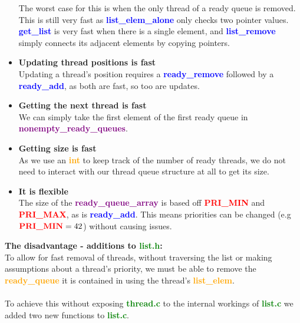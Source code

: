 \documentclass{report}
\newcommand{\bullpara}[2]{\item \textbf{#1} \ #2}
\newcommand{\fun}[1]{\textcolor{blue}{\textbf{#1}}}
\newcommand{\file}[1]{\textcolor{green}{\textbf{#1}}}
\newcommand{\struct}[1]{\textcolor{orange}{\textbf{#1}}}
\newcommand{\var}[1]{\textcolor{purple}{\textbf{#1}}}
\newcommand{\const}[1]{\textcolor{red}{\textbf{#1}}}
\newcommand{\pintoscode}[4]{}
\begin{document}
\begin{itemize}
{\begin{enumerate}
                        \end{enumerate}
                        The worst case for this is when the only thread of a ready queue is removed. This is still very fast as \fun{list\_elem\_alone} only checks two pointer values. \fun{get\_list} is very fast when there is a single element, and \fun{list\_remove} simply connects its adjacent elements by copying pointers.
                    }
                    \bullpara{Updating thread positions is fast}{
                        \\ Updating a thread's position requires a \fun{ready\_remove} followed by a \fun{ready\_add}, as both are fast, so too are updates.
                    }
                    \bullpara{Getting the next thread is fast}{
                        \\ We can simply take the first element of the first ready queue in \var{nonempty\_ready\_queues}.
                    }
                    \bullpara{Getting size is fast}{
                        \\ As we use an \struct{int} to keep track of the number of ready threads, we do not need to interact with our thread queue structure at all to get its size.
                    }
                    \bullpara{It is flexible}{
                        \\ The size of the \var{ready\_queue\_array} is based off \const{PRI\_MIN} and \const{PRI\_MAX}, as is \fun{ready\_add}. This means priorities can be changed (e.g $\text{\const{PRI\_MIN}} = 42$) without causing issues.
                    }
                \end{itemize}
                \textbf{The disadvantage - additions to \file{list.h}:}
                \\ To allow for fast removal of threads, without traversing the list or making assumptions about a thread's priority, we must be able to remove the \struct{ready\_queue} it is contained in using the thread's \struct{list\_elem}. 
                \\
                \\ To achieve this without exposing \file{thread.c} to the internal workings of \file{list.c} we added two new functions to \file{list.c}. 
                \pintoscode{316}{320}{list.c}{../lib/kernel/list.c}
                \pintoscode{288}{295}{list.c}{../lib/kernel/list.c}
\end{document}
